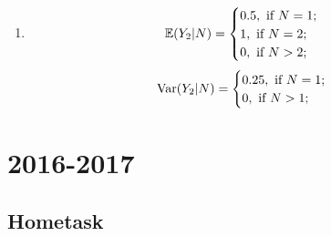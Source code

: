 \documentclass[12pt, a4paper]{article}
\begin{document}
\begin{enumerate}
\item
\[
\mathbb{E}(Y_2 |N) =\begin{cases}
0.5, \text{ if } N=1; \\
1, \text{ if } N=2; \\
0, \text{ if } N>2; \\
\end{cases}
\]
\[
\operatorname{Var}(Y_2 |N) =\begin{cases}
0.25, \text{ if } N=1; \\
0, \text{ if } N>1; \\
\end{cases}
\]
\end{enumerate}


\section{2016-2017}

\subsection{Hometask}
\end{document}
